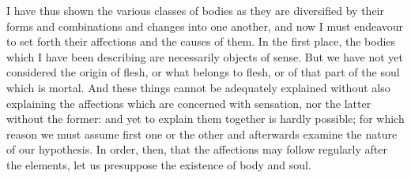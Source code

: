\documentclass[11pt,letter]{article}
\begin{document}
\par  I have thus shown the various classes of bodies as they are diversified by their forms and combinations and changes into one another, and now I must endeavour to set forth their affections and the causes of them. In the first place, the bodies which I have been describing are necessarily objects of sense. But we have not yet considered the origin of flesh, or what belongs to flesh, or of that part of the soul which is mortal. And these things cannot be adequately explained without also explaining the affections which are concerned with sensation, nor the latter without the former: and yet to explain them together is hardly possible; for which reason we must assume first one or the other and afterwards examine the nature of our hypothesis. In order, then, that the affections may follow regularly after the elements, let us presuppose the existence of body and soul.
\end{document}
